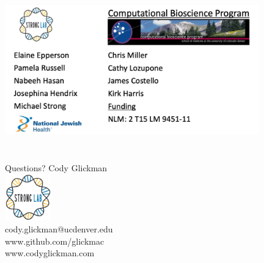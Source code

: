 \documentclass[11pt, xcolor=table]{beamer}
\begin{document}
	
	
	
	\begin{frame}{}
	\vspace{1cm}
	{\includegraphics[height=7cm, width=11cm]{acknowledgement.jpg} }
	\end{frame}
	
	
	\begin{frame}{Questions?}
	\center
	Cody Glickman \\ \includegraphics[height=2cm, width=2cm]{lablogo.png} \\ cody.glickman@ucdenver.edu \\ \alert{www.github.com/glickmac} \\ www.codyglickman.com
	\end{frame}
	
	
	
\end{document}

